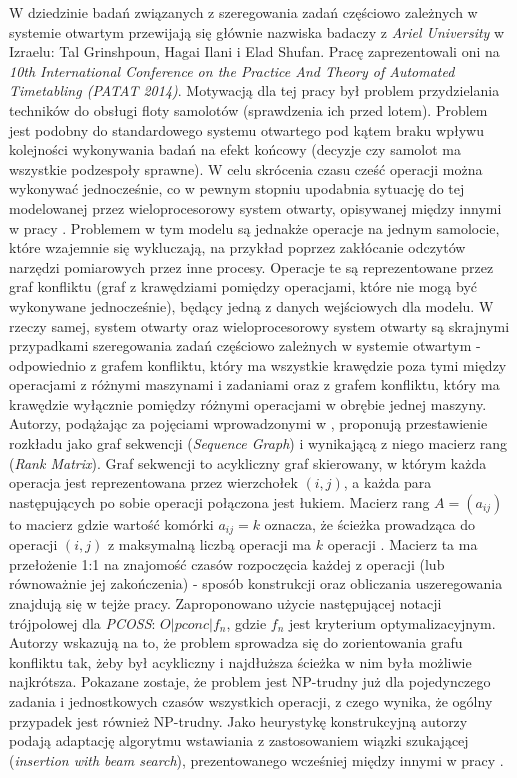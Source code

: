 \documentclass[brudnopis]{xmgr}
\begin{document}
W dziedzinie badań związanych z szeregowania zadań częściowo zależnych w systemie otwartym przewijają się głównie nazwiska badaczy z \emph{Ariel University} w Izraelu: Tal Grinshpoun, Hagai Ilani i Elad Shufan. Pracę \cite{grinshpoun2014partially} zaprezentowali oni na \emph{10th International Conference on the Practice And Theory of Automated Timetabling (PATAT 2014)}. Motywacją dla tej pracy był problem przydzielania techników do obsługi floty samolotów (sprawdzenia ich przed lotem). Problem jest podobny do standardowego systemu otwartego pod kątem braku wpływu kolejności wykonywania badań na efekt końcowy (decyzje czy samolot ma wszystkie podzespoły sprawne). W celu skrócenia czasu cześć operacji można wykonywać jednocześnie, co w pewnym stopniu upodabnia sytuację do tej modelowanej przez wieloprocesorowy system otwarty, opisywanej między innymi w pracy \cite{adakmultiprocessor}. Problemem w tym modelu są jednakże operacje na jednym samolocie, które wzajemnie się wykluczają, na przykład poprzez zakłócanie odczytów narzędzi pomiarowych przez inne procesy. Operacje te są reprezentowane przez graf konfliktu (graf z krawędziami pomiędzy operacjami, które nie mogą być wykonywane jednocześnie), będący jedną z danych wejściowych dla modelu. W rzeczy samej, system otwarty oraz wieloprocesorowy system otwarty są skrajnymi przypadkami szeregowania zadań częściowo zależnych w systemie otwartym - odpowiednio z grafem konfliktu, który ma wszystkie krawędzie poza tymi między operacjami z różnymi maszynami i zadaniami oraz z grafem konfliktu, który ma krawędzie wyłącznie pomiędzy różnymi operacjami w obrębie jednej maszyny.\\
Autorzy, podążając za pojęciami wprowadzonymi w \cite{brasel2006matrices}, proponują przestawienie rozkładu jako graf sekwencji (\emph{Sequence Graph}) i wynikającą z niego macierz rang (\emph{Rank Matrix}). Graf sekwencji to acykliczny graf skierowany, w którym każda operacja jest reprezentowana przez wierzchołek $(i, j)$, a każda para następujących po sobie operacji połączona jest łukiem. Macierz rang $A = (a_{ij})$ to macierz gdzie wartość komórki $a_{ij} = k$ oznacza, że ścieżka prowadząca do operacji $(i, j)$ z maksymalną liczbą operacji ma $k$ operacji \cite{brasel2008heuristic}. Macierz ta ma przełożenie 1:1 na znajomość czasów rozpoczęcia każdej z operacji (lub równoważnie jej zakończenia) - sposób konstrukcji oraz obliczania uszeregowania znajdują się w tejże pracy. Zaproponowano użycie następującej notacji trójpolowej dla \emph{PCOSS}: $O|pconc|f_n$, gdzie $f_n$ jest kryterium optymalizacyjnym. Autorzy wskazują na to, że problem sprowadza się do zorientowania grafu konfliktu tak, żeby był acykliczny i najdłuższa ścieżka w nim była możliwie najkrótsza. Pokazane zostaje, że problem jest NP-trudny już dla pojedynczego zadania i jednostkowych czasów wszystkich operacji, z czego wynika, że ogólny przypadek jest również NP-trudny. Jako heurystykę konstrukcyjną autorzy podają adaptację algorytmu wstawiania z zastosowaniem wiązki szukającej (\emph{insertion with beam search}), prezentowanego wcześniej między innymi w pracy \cite{brasel1993constructive}.
\medskip
\end{document}
